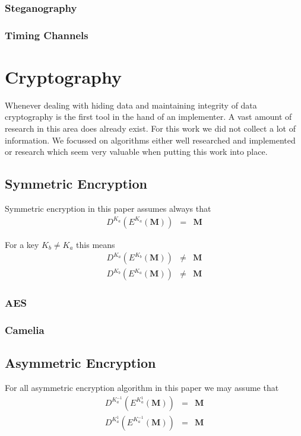 \subsubsection{Steganography}

\subsubsection{Timing Channels}

\section{Cryptography}
Whenever dealing with hiding data and maintaining integrity of data cryptography is the first tool in the hand of an implementer. A vast amount of research in this area does already exist. For this work we did not collect a lot of information. We focussed on algorithms either well researched and implemented or research which seem very valuable when putting this work into place. 

\subsection{Symmetric Encryption}
Symmetric encryption in this paper assumes always that
\begin{eqnarray}
	D^{K_a}\left(E^{K_a}\left(\mathbf{M}\right)\right) & = & \mathbf{M}
\end{eqnarray} 

For a key $K_b\neq K_a$ this means
\begin{eqnarray}
	D^{K_a}\left(E^{K_b}\left(\mathbf{M}\right)\right) & \neq & \mathbf{M}\\
	D^{K_b}\left(E^{K_a}\left(\mathbf{M}\right)\right) & \neq & \mathbf{M}
\end{eqnarray} 

\subsubsection{AES}

\subsubsection{Camelia}

\subsection{Asymmetric Encryption}
For all asymmetric encryption algorithm in this paper we may assume that 
\begin{eqnarray}
	D^{K^{-1}_a}\left(E^{K^{1}_a}\left(\mathbf{M}\right)\right) & = & \mathbf{M}\\
	D^{K^{1}_a}\left(E^{K^{-1}_a}\left(\mathbf{M}\right)\right) & = & \mathbf{M}
\end{eqnarray} 

